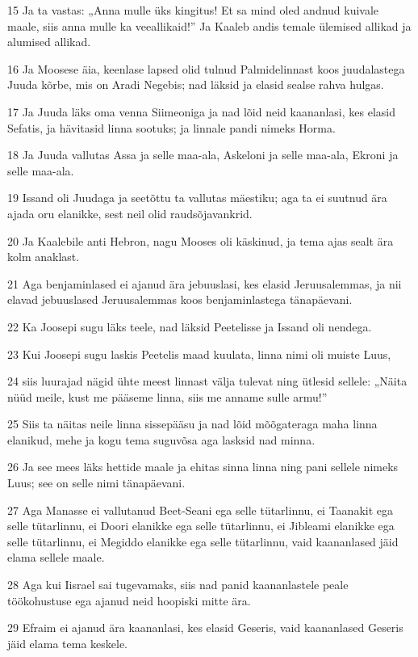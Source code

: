\par 15 Ja ta vastas: „Anna mulle üks kingitus! Et sa mind oled andnud kuivale maale, siis anna mulle ka veeallikaid!” Ja Kaaleb andis temale ülemised allikad ja alumised allikad.
\par 16 Ja Moosese äia, keenlase lapsed olid tulnud Palmidelinnast koos juudalastega Juuda kõrbe, mis on Aradi Negebis; nad läksid ja elasid sealse rahva hulgas.
\par 17 Ja Juuda läks oma venna Siimeoniga ja nad lõid neid kaananlasi, kes elasid Sefatis, ja hävitasid linna sootuks; ja linnale pandi nimeks Horma.
\par 18 Ja Juuda vallutas Assa ja selle maa-ala, Askeloni ja selle maa-ala, Ekroni ja selle maa-ala.
\par 19 Issand oli Juudaga ja seetõttu ta vallutas mäestiku; aga ta ei suutnud ära ajada oru elanikke, sest neil olid raudsõjavankrid.
\par 20 Ja Kaalebile anti Hebron, nagu Mooses oli käskinud, ja tema ajas sealt ära kolm anaklast.
\par 21 Aga benjaminlased ei ajanud ära jebuuslasi, kes elasid Jeruusalemmas, ja nii elavad jebuuslased Jeruusalemmas koos benjaminlastega tänapäevani.
\par 22 Ka Joosepi sugu läks teele, nad läksid Peetelisse ja Issand oli nendega.
\par 23 Kui Joosepi sugu laskis Peetelis maad kuulata, linna nimi oli muiste Luus,
\par 24 siis luurajad nägid ühte meest linnast välja tulevat ning ütlesid sellele: „Näita nüüd meile, kust me pääseme linna, siis me anname sulle armu!”
\par 25 Siis ta näitas neile linna sissepääsu ja nad lõid mõõgateraga maha linna elanikud, mehe ja kogu tema suguvõsa aga lasksid nad minna.
\par 26 Ja see mees läks hettide maale ja ehitas sinna linna ning pani sellele nimeks Luus; see on selle nimi tänapäevani.
\par 27 Aga Manasse ei vallutanud Beet-Seani ega selle tütarlinnu, ei Taanakit ega selle tütarlinnu, ei Doori elanikke ega selle tütarlinnu, ei Jibleami elanikke ega selle tütarlinnu, ei Megiddo elanikke ega selle tütarlinnu, vaid kaananlased jäid elama sellele maale.
\par 28 Aga kui Iisrael sai tugevamaks, siis nad panid kaananlastele peale töökohustuse ega ajanud neid hoopiski mitte ära.
\par 29 Efraim ei ajanud ära kaananlasi, kes elasid Geseris, vaid kaananlased Geseris jäid elama tema keskele.
